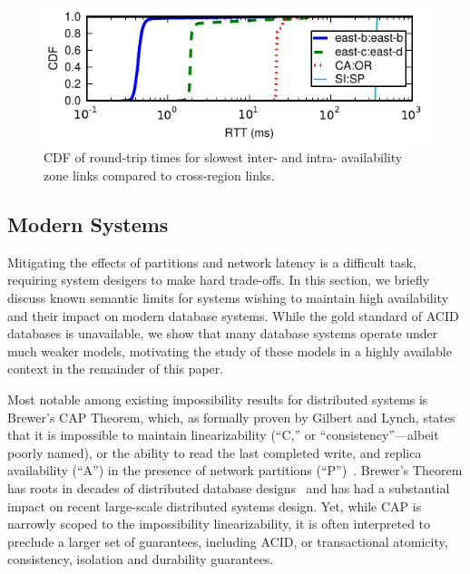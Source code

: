 \begin{figure}
\includegraphics[width=\columnwidth]{graphs/ping-plot.pdf}
\caption{CDF of round-trip times for slowest inter- and intra-
  availability zone links compared to cross-region links.}
\label{fig:rtt}
\end{figure}


\subsection{Modern Systems}
\label{sec:modernacid}

Mitigating the effects of partitions and network latency is a
difficult task, requiring system desigers to make hard trade-offs. In
this section, we briefly discuss known semantic limits for systems
wishing to maintain high availability and their impact on modern
database systems. While the gold standard of ACID databases is
unavailable, we show that many database systems operate under much
weaker models, motivating the study of these models in a highly
available context in the remainder of this paper.

Most notable among existing impossibility results for distributed
systems is Brewer's CAP Theorem, which, as formally proven by Gilbert
and Lynch, states that it is impossible to maintain linearizability
(``C,'' or ``consistency''---albeit poorly named), or the ability to
read the last completed write, and replica availability (``A'') in the
presence of network partitions (``P'')~\cite{gilbert-cap}. Brewer's
Theorem has roots in decades of distributed database
designs~\cite{davidson-survey} and has had a substantial impact on
recent large-scale distributed systems design. Yet, while CAP is
narrowly scoped to the impossibility linearizability, it is often
interpreted to preclude a larger set of guarantees, including ACID, or
transactional atomicity, consistency, isolation and durability
guarantees.


